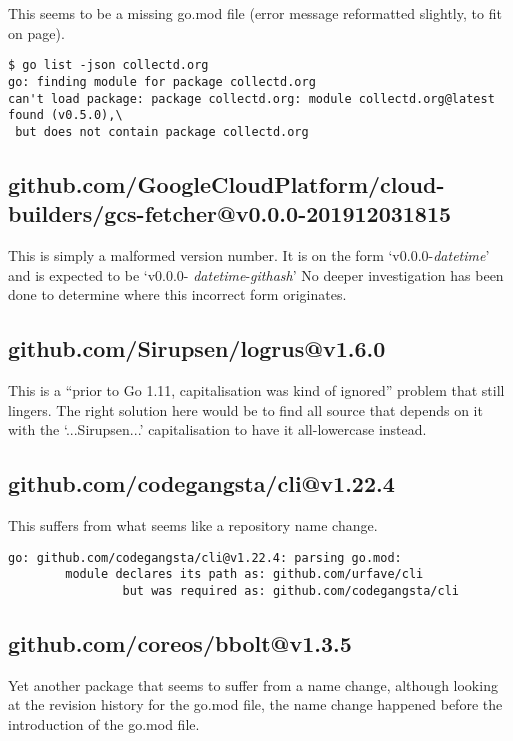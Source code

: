 \documentclass[a4paper]{paper}
\begin{document}
This seems to be a missing go.mod file (error message reformatted slightly, to fit on page).

\begin{verbatim}
$ go list -json collectd.org
go: finding module for package collectd.org
can't load package: package collectd.org: module collectd.org@latest found (v0.5.0),\
 but does not contain package collectd.org
\end{verbatim}

\subsection{github.com/GoogleCloudPlatform/cloud-builders/gcs-fetcher@v0.0.0-201912031815}

This is simply a malformed version number. It is on the form
`v0.0.0-{\it datetime}' and is expected to be `v0.0.0-{\it
  datetime}-{\it githash}' No deeper investigation has been done to
determine where this incorrect form originates.

\subsection{github.com/Sirupsen/logrus@v1.6.0}

This is a ``prior to Go 1.11, capitalisation was kind of ignored''
problem that still lingers. The right solution here would be to find
all source that depends on it with the `...Sirupsen...' capitalisation
to have it all-lowercase instead.

\subsection{github.com/codegangsta/cli@v1.22.4}

This suffers from what seems like a repository name change.

\begin{verbatim}
go: github.com/codegangsta/cli@v1.22.4: parsing go.mod:
        module declares its path as: github.com/urfave/cli
                but was required as: github.com/codegangsta/cli
\end{verbatim}

\subsection{github.com/coreos/bbolt@v1.3.5}

Yet another package that seems to suffer from a name change, although
looking at the revision history for the go.mod file, the name change
happened before the introduction of the go.mod file.
\end{document}
